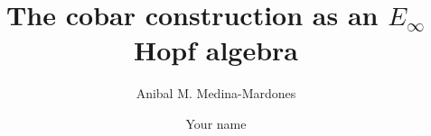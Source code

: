 \documentclass{amsart}
\theoremstyle{definition}
\begin{document}
\title{The cobar construction as an $E_\infty$ Hopf algebra}
\author{Anibal M. Medina-Mardones}
\address{Max Plank Institute for Mathematics, Bonn, Germany}
\address{Department of Mathematics, University of Notre Dame, Notre Dame, IN, USA}
\author{Your name}
\address{Your address}


\begin{abstract}
	
\end{abstract} 

\vspace*{-1cm}

\maketitle

\tableofcontents







 


\end{document}
